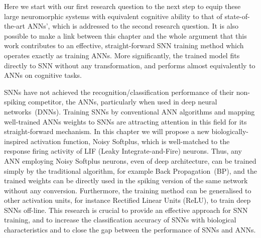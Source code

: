 \label{cha:Conv}

Here we start with our first research question to the next step to equip these large neuromorphic systems with equivalent cognitive ability to that of state-of-the-art ANNs', which is addressed to the second research question.
It is also possible to make a link between this chapter and the whole argument that this work contributes to an effective, straight-forward SNN training method which operates exactly as training ANNs.
More significantly, the trained model fits directly to SNN without any transformation, and performs almost equivalently to ANNs on cognitive tasks.

SNNs have not achieved the recognition/classification performance of their non-spiking competitor, the ANNs, particularly when used in deep neural networks~(DNNs).
Training SNNs by conventional ANN algorithms and mapping well-trained ANNs weights to SNNs are attracting attention in this field for its straight-forward mechanism.
In this chapter we will propose a new biologically-inspired activation function, Noisy Softplus, which is well-matched to the response firing activity of LIF (Leaky Integrate-and-Fire) neurons.
Thus, any ANN employing Noisy Softplus neurons, even of deep architecture, can be trained simply by the traditional algorithm, for example Back Propagation~(BP), and the trained weights can be directly used in the spiking version of the same network without any conversion.
Furthermore, the training method can be generalised to other activation units, for instance Rectified Linear Units (ReLU), to train deep SNNs off-line.
This research is crucial to provide an effective approach for SNN training, and to increase the classification accuracy of SNNs with biological characteristics and to close the gap between the performance of SNNs and ANNs.

